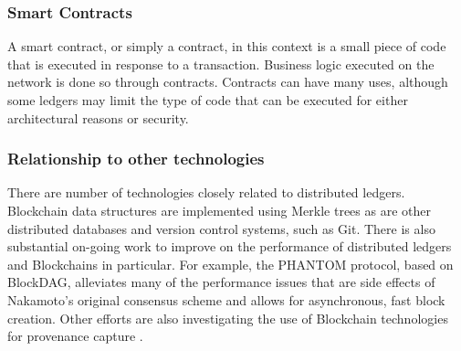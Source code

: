 \subsubsection{Smart Contracts}
A smart contract, or simply a contract, in this context is a small piece of code that is executed in response to a transaction. Business logic executed on the network is done so through contracts. Contracts can have many uses, although some ledgers may limit the type of code that can be executed for either architectural reasons or security.

\subsubsection{Relationship to other technologies}
There are number of technologies closely related to distributed ledgers. Blockchain data structures are implemented using Merkle trees \cite{merkle_digital_1987} as are other distributed databases and version control systems, such as Git. There is also substantial on-going work to improve on the performance of distributed ledgers and Blockchains in particular. For example, the PHANTOM protocol, based on BlockDAG, alleviates many of the performance issues that are side effects of Nakamoto's original consensus scheme and allows for asynchronous, fast block creation. Other efforts are also investigating the use of Blockchain technologies for provenance capture \cite{richard_brooks_and_anthony_skjellum_using_2017}\cite{worley_scrybe:_nodate}.

